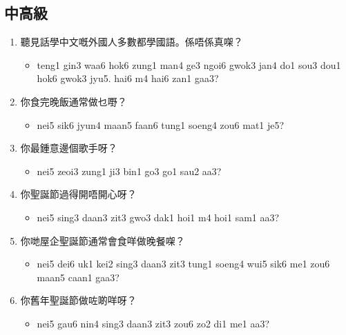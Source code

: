 \documentclass[12pt,a4paper]{leaflet}
\begin{document}
\begin{tcolorbox}[enhanced, breakable, skin first=enhanced, skin middle=enhanced, skin last=enhanced,colback=LightBlue!20!white, colframe=LightBlue!50!black, boxrule=0.5mm]
\subsection*{中高級}
\begin{enumerate}[label={},leftmargin=0pt, itemindent=0pt]
\item \LARGE{聽見話學中文嘅外國人多數都學國語。係唔係真㗎？}
\begin{itemize}[label={},leftmargin=0pt, itemindent=0pt]
\item \footnotesize\textsf{teng1 gin3 waa6 hok6 zung1 man4 ge3 ngoi6 gwok3 jan4 do1 sou3 dou1 hok6 gwok3 jyu5. hai6 m4 hai6 zan1 gaa3?}
\end{itemize}
\item \LARGE{你食完晚飯通常做乜嘢？}
\begin{itemize}[label={},leftmargin=0pt, itemindent=0pt]
\item \footnotesize\textsf{nei5 sik6 jyun4 maan5 faan6 tung1 soeng4 zou6 mat1 je5?}
\end{itemize}
\item \LARGE{你最鍾意邊個歌手呀？}
\begin{itemize}[label={},leftmargin=0pt, itemindent=0pt]
\item \footnotesize\textsf{nei5 zeoi3 zung1 ji3 bin1 go3 go1 sau2 aa3?}
\end{itemize}
\item \LARGE{你聖誕節過得開唔開心呀？}
\begin{itemize}[label={},leftmargin=0pt, itemindent=0pt]
\item \footnotesize\textsf{nei5 sing3 daan3 zit3 gwo3 dak1 hoi1 m4 hoi1 sam1 aa3?}
\end{itemize}
\item \LARGE{你哋屋企聖誕節通常會食咩做晚餐㗎？}
\begin{itemize}[label={},leftmargin=0pt, itemindent=0pt]
\item \footnotesize\textsf{nei5 dei6 uk1 kei2 sing3 daan3 zit3 tung1 soeng4 wui5 sik6 me1 zou6 maan5 caan1 gaa3?}
\end{itemize}
\item \LARGE{你舊年聖誕節做咗啲咩呀？}
\begin{itemize}[label={},leftmargin=0pt, itemindent=0pt]
\item \footnotesize\textsf{nei5 gau6 nin4 sing3 daan3 zit3 zou6 zo2 di1 me1 aa3?}

\end{itemize}
\end{enumerate}
\end{tcolorbox}
\end{document}
